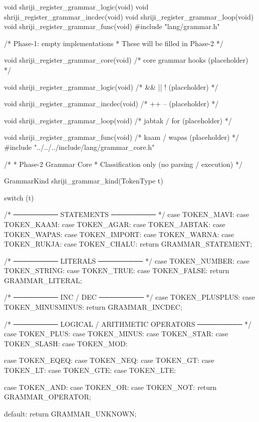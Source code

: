 \documentclass{article}
\begin{document}
void shriji_register_grammar_logic(void) {}
void shriji_register_grammar_incdec(void) {}
void shriji_register_grammar_loop(void) {}
void shriji_register_grammar_func(void) {}
#include "lang/grammar.h"

/* Phase-1: empty implementations
 * These will be filled in Phase-2
 */

void shriji_register_grammar_core(void) {
    /* core grammar hooks (placeholder) */
}

void shriji_register_grammar_logic(void) {
    /* && || ! (placeholder) */
}

void shriji_register_grammar_incdec(void) {
    /* ++ -- (placeholder) */
}

void shriji_register_grammar_loop(void) {
    /* jabtak / for (placeholder) */
}

void shriji_register_grammar_func(void) {
    /* kaam / wapas (placeholder) */
}
#include "../../../include/lang/grammar_core.h"

/*
 * Phase-2 Grammar Core
 * Classification only (no parsing / execution)
 */

GrammarKind shriji_grammar_kind(TokenType t)
{
    switch (t) {

        /* ───────── STATEMENTS ───────── */
        case TOKEN_MAVI:
        case TOKEN_KAAM:
        case TOKEN_AGAR:
        case TOKEN_JABTAK:
        case TOKEN_WAPAS:
        case TOKEN_IMPORT:
        case TOKEN_WARNA:
        case TOKEN_RUKJA:
        case TOKEN_CHALU:
            return GRAMMAR_STATEMENT;

        /* ───────── LITERALS ───────── */
        case TOKEN_NUMBER:
        case TOKEN_STRING:
        case TOKEN_TRUE:
        case TOKEN_FALSE:
            return GRAMMAR_LITERAL;

        /* ───────── INC / DEC ───────── */
        case TOKEN_PLUSPLUS:
        case TOKEN_MINUSMINUS:
            return GRAMMAR_INCDEC;

        /* ───────── LOGICAL / ARITHMETIC OPERATORS ───────── */
        case TOKEN_PLUS:
        case TOKEN_MINUS:
        case TOKEN_STAR:
        case TOKEN_SLASH:
        case TOKEN_MOD:

        case TOKEN_EQEQ:
        case TOKEN_NEQ:
        case TOKEN_GT:
        case TOKEN_LT:
        case TOKEN_GTE:
        case TOKEN_LTE:

        case TOKEN_AND:
        case TOKEN_OR:
        case TOKEN_NOT:
            return GRAMMAR_OPERATOR;

        default:
            return GRAMMAR_UNKNOWN;
    }
}
\end{document}
